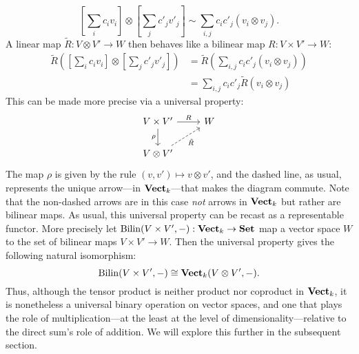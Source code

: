 \[\textstyle[\sum_ic_iv_i]\otimes [\sum_j c'_jv'_j]\sim \sum_{i,j}c_ic'_j(v_i\otimes v_j).\]
A linear map $\tilde{R}:V\otimes V'\to W$ then behaves like a bilinear map $R:V\times V'\to W$:
\begin{align*}
    \textstyle \tilde{R}([\sum_ic_iv_i]\otimes [\sum_j c'_jv'_j]) &= \textstyle \tilde{R}(\sum_{i,j}c_ic'_j(v_i\otimes v_j)) \\
    &=\textstyle \sum_{i,j}c_ic'_j \tilde{R}(v_i\otimes v_j)
\end{align*}
This can be made more precise via a universal property:
\[
\begin{tikzcd}
V\times V' \arrow[d,"\rho"'] \arrow[r,"R"] & W \\
V\otimes V' \arrow[ur,dashed,"\tilde{R}"']
\end{tikzcd}
\]
The map $\rho$ is given by the rule $(v,v')\mapsto v\otimes v'$, and the dashed line, as usual, represents the unique arrow---in $\mathbf{Vect}_k$---that makes the diagram commute. Note that the non-dashed arrows are in this case \emph{not} arrows in $\mathbf{Vect}_k$ but rather are bilinear maps. As usual, this universal property can be recast as a representable functor. More precisely let $\operatorname{Bilin}(V\times V',-):\mathbf{Vect}_k\to\mathbf{Set}$ map a vector space $W$ to the set of bilinear maps $V\times V'\to W$. Then the universal property gives the following natural isomorphism:
\[\operatorname{Bilin}(V\times V',-)\cong \mathbf{Vect}_k(V\otimes V',-).\]
Thus, although the tensor product is neither product nor coproduct in $\mathbf{Vect}_k$, it is nonetheless a universal binary operation on vector spaces, and one that plays the role of multiplication---at the least at the level of dimensionality---relative to the direct sum's role of addition. We will explore this further in the subsequent section.

